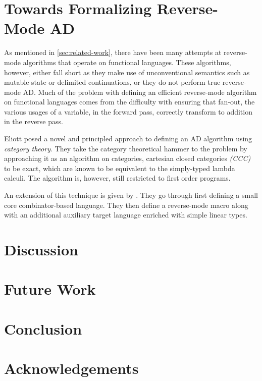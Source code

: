 \documentclass[11pt, final]{article}
\begin{document}
\section{Towards Formalizing Reverse-Mode AD}\label{sec:rev}
  As mentioned in \cref{sec:related-work}, there have been many attempts at reverse-mode algorithms that operate on functional languages.
  These algorithms, however, either fall short as they make use of unconventional semantics such as mutable state or delimited continuations, or they do not perform true reverse-mode AD.
  Much of the problem with defining an efficient reverse-mode algorithm on functional languages comes from the difficulty with ensuring that fan-out, the various usages of a variable, in the forward pass, correctly transform to addition in the reverse pass.

  Eliott posed a novel and principled approach to defining an AD algorithm using \textit{category theory}\cite{Elliott-2018-ad-icfp}.
  They take the category theoretical hammer to the problem by approaching it as an algorithm on categories, cartesian closed categories \textit{(CCC)} to be exact, which are known to be equivalent to the simply-typed lambda calculi\cite{Elliott-2017-compiling-to-categories}\cite{10.1007/3-540-15198-2_10}.
  The algorithm is, however, still restricted to first order programs.

  An extension of this technique is given by \Vakar{}\cite{vkr2020reverse}.
  They go through first defining a small core combinator-based language.
  They then define a reverse-mode macro along with an additional auxiliary target language enriched with simple linear types.
  
  
  
\section{Discussion}
  
\section{Future Work}
  
\section{Conclusion}
  
\section*{Acknowledgements}

\clearpage
\printbibliography
\makeatother
\end{document}
